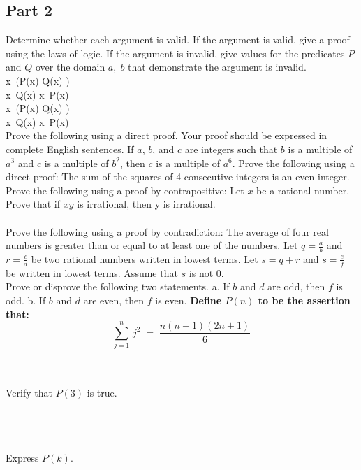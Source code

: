  \subsection*{Part 2}
Determine whether each argument is valid. If the argument is valid, give a proof using the laws of logic. If the argument is invalid, give values for the predicates $P$ and $Q$ over the domain ${a,\; b}$ that demonstrate the argument is invalid.\\
\exists x\, (P(x)\; \land \;Q(x) )\\
\therefore \exists x\, Q(x)\; \land\; \exists x \,P(x) \\
\forall x\, (P(x)\; \lor \;Q(x) )\\
\therefore \forall x\, Q(x)\; \lor \; \forall x\, P(x) \\
Prove the following using a direct proof. Your proof should be expressed in complete English sentences.
If $a$, $b$, and $c$ are integers such that $b$ is a multiple of $a^3$ and $c$ is a multiple of $b^2$, then $c$ is a multiple of $a^6$.
Prove the following using a direct proof:
The sum of the squares of 4 consecutive integers is an even integer.
Prove the following using a proof by contrapositive:
Let $x$ be a rational number. Prove that if $xy$ is irrational, then y is irrational.\\\\
Prove the following using a proof by contradiction:
The average of four real numbers is greater than or equal to at least one of the numbers.
Let $\displaystyle q = \frac{a}{b}$ and $\displaystyle r = \frac{c}{d}$ be two rational numbers written in lowest terms. Let $s = q + r$ and $\displaystyle s = \frac{e}{f}$ be written in lowest terms. Assume that $s$ is not $0$.\\
 Prove or disprove the following two statements.
a.  If $b$ and $d$ are odd, then $f$ is odd.
b. If $b$ and $d$ are even, then $f$ is even.
{\bf Define $P(n)$ to be the assertion that:}\\
\[\displaystyle \sum_{j=1}^{n}\, j^2 \;=\;\frac{n(n+1)(2n+1)}{6}\]\\\\
  \item Verify that $P(3)$ is true.\\\\
   \\\\
  \item Express $P(k)$.\\\\
